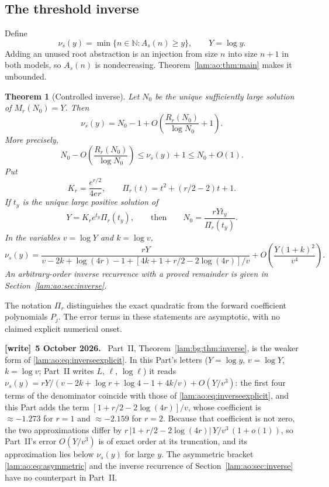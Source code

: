 \documentclass[11pt,a4paper]{article}
\numberwithin{equation}{section}
\newtheorem{theorem}{Theorem}[section]
\theoremstyle{remark}
\newcommand{\N}{\mathbb N}
\newenvironment{writenote}[1][]{\par\smallskip\begingroup\small
 \noindent\textbf{[write]}\if\relax\detokenize{#1}\relax\else~\textbf{#1.}\fi\ }%
 {\par\endgroup\smallskip}
\begin{document}
\subsection{The threshold inverse}
Define
\[
 \nu_s(y)=\min\{n\in\N:A_s(n)\ge y\},\qquad Y=\log y.
\]
Adding an unused root abstraction is an injection from size $n$ into size $n+1$ in both models, so $A_s(n)$ is nondecreasing. Theorem~\ref{lam:ao:thm:main} makes it unbounded.
\begin{theorem}[Controlled inverse]\label{lam:ao:thm:inverse}
Let $N_0$ be the unique sufficiently large solution of $M_r(N_0)=Y$. Then
\begin{equation}\label{lam:ao:eq:threshold}
 \nu_s(y)=N_0-1+O\!\left(\frac{R_r(N_0)}{\log N_0}+1\right).
\end{equation}
More precisely,
\begin{equation}\label{lam:ao:eq:asymmetric}
 N_0-O\!\left(\frac{R_r(N_0)}{\log N_0}\right)
 \le\nu_s(y)+1\le N_0+O(1).
\end{equation}
Put
\[
 K_r=\frac{e^{r/2}}{4er},\qquad \Pi_r(t)=t^2+(r/2-2)t+1.
\]
If $t_y$ is the unique large positive solution of
\begin{equation}\label{lam:ao:eq:inverseparam}
 Y=K_re^{t_y}\Pi_r(t_y),
 \qquad\text{then}\qquad N_0=\frac{rYt_y}{\Pi_r(t_y)}.
\end{equation}
In the variables $v=\log Y$ and $k=\log v$,
\begin{equation}\label{lam:ao:eq:inverseexplicit}
 \nu_s(y)=\frac{rY}{v-2k+\log(4r)-1+
            [4k+1+r/2-2\log(4r)]/v}
       +O\!\left(\frac{Y(1+k)^2}{v^4}\right).
\end{equation}
An arbitrary-order inverse recurrence with a proved remainder is given in Section~\ref{lam:ao:sec:inverse}.
\end{theorem}
The notation $\Pi_r$ distinguishes the exact quadratic from the forward coefficient polynomials $P_j$. The error terms in these statements are asymptotic, with no claimed explicit numerical onset.
\begin{writenote}[5 October 2026]
Part~II, Theorem~\ref{lam:bg:thm:inverse}, is the weaker form of \eqref{lam:ao:eq:inverseexplicit}. In this Part's letters ($Y=\log y$, $v=\log Y$, $k=\log v$; Part~II writes $L$, $\ell$, $\log\ell$) it reads $\nu_s(y)=rY/(v-2k+\log r+\log4-1+4k/v)+O(Y/v^3)$: the first four terms of the denominator coincide with those of \eqref{lam:ao:eq:inverseexplicit}, and this Part adds the term $[1+r/2-2\log(4r)]/v$, whose coefficient is $\approx-1.273$ for $r=1$ and $\approx-2.159$ for $r=2$. Because that coefficient is not zero, the two approximations differ by $r\,|1+r/2-2\log(4r)|\,Y/v^3\,(1+o(1))$, so Part~II's error $O(Y/v^3)$ is of exact order at its truncation, and its approximation lies below $\nu_s(y)$ for large $y$. The asymmetric bracket \eqref{lam:ao:eq:asymmetric} and the inverse recurrence of Section~\ref{lam:ao:sec:inverse} have no counterpart in Part~II.
\end{writenote}
\end{document}
